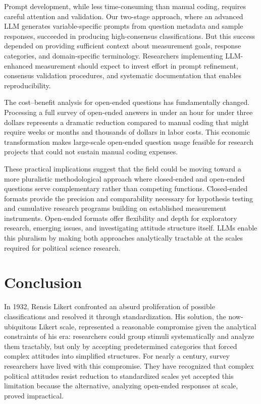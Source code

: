 \documentclass[
  journal=ram,
  manuscript=article-type,
  year=2025,
  volume=unpublished,
]{cup-journal}
\begin{document}
Prompt development, while less time-consuming than manual coding, requires careful attention and validation.
Our two-stage approach, where an advanced LLM generates variable-specific prompts from question metadata and sample responses, succeeded in producing high-consensus classifications.
But this success depended on providing sufficient context about measurement goals, response categories, and domain-specific terminology.
Researchers implementing LLM-enhanced measurement should expect to invest effort in prompt refinement, consensus validation procedures, and systematic documentation that enables reproducibility.

The cost–benefit analysis for open-ended questions has fundamentally changed.
Processing a full survey of open-ended answers in under an hour for under three dollars represents a dramatic reduction compared to manual coding that might require weeks or months and thousands of dollars in labor costs.
This economic transformation makes large-scale open-ended question usage feasible for research projects that could not sustain manual coding expenses.

These practical implications suggest that the field could be moving toward a more pluralistic methodological approach where closed-ended and open-ended questions serve complementary rather than competing functions.
Closed-ended formats provide the precision and comparability necessary for hypothesis testing and cumulative research programs building on established measurement instruments.
Open-ended formats offer flexibility and depth for exploratory research, emerging issues, and investigating attitude structure itself.
LLMs enable this pluralism by making both approaches analytically tractable at the scales required for political science research.

\section{Conclusion}

In 1932, Rensis Likert confronted an absurd proliferation of possible classifications and resolved it through standardization. His solution, the now-ubiquitous Likert scale, represented a reasonable compromise given the analytical constraints of his era: researchers could group stimuli systematically and analyze them tractably, but only by accepting predetermined categories that forced complex attitudes into simplified structures. For nearly a century, survey researchers have lived with this compromise. They have recognized that complex political attitudes resist reduction to standardized scales yet accepted this limitation because the alternative, analyzing open-ended responses at scale, proved impractical.
\end{document}
